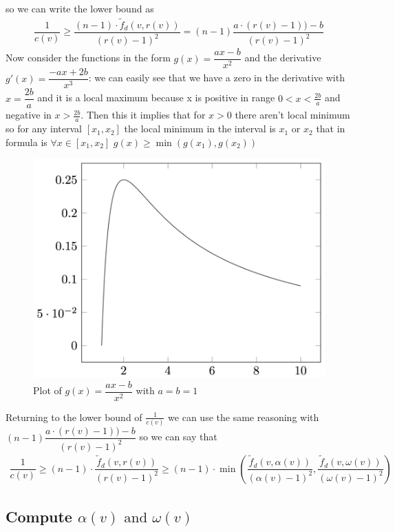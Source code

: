 so we can write the lower bound as 
\begin{align*}
\dfrac{1}{c(v)} \geq \dfrac{(n-1) \cdot \tilde{f}_d(v, r(v))}{(r(v) -1)^2} =(n-1)\dfrac{a \cdot (r(v) - 1))   - b}{(r(v) -1)^2}
\end{align*}
Now consider the functions in the form $ g(x) = \dfrac{ax - b}{x^2} $ and the derivative $ g'(x) = \dfrac{-ax + 2b}{x^3} $: we can easily see that we have a zero in the derivative with $ x = \dfrac{2b}{a} $ and it is a local maximum because x is positive in range $ 0 < x < \frac{2b}{a} $ and negative in $ x > \frac{2b}{a} $. Then this it implies that for $ x > 0 $ there aren't local minimum so for any interval $ [x_1, x_2] $ the local minimum in the interval is $ x_1  $ or $ x_2 $ that in formula is $ \forall x \in [x_1, x_2] \,\, g(x)  \geq \min(g(x_1), g(x_2))$
\begin{figure}[H]
	\includegraphics[width=0.7\linewidth]{img/local_maximum}
	\caption{Plot of $ g(x) = \dfrac{ax -b}{x^2} $ with $ a = b = 1 $}
	\label{fig:localmaximum}
\end{figure}
Returning to the lower bound of $ \frac{1}{c(v)} $ we can use the same reasoning with $ (n-1)\dfrac{a \cdot (r(v) - 1))   - b}{(r(v) -1)^2} $ so we can say that 
\begin{align*}
\dfrac{1}{c(v)} \geq (n-1) \cdot \dfrac{\tilde{f}_d(v, r(v))}{(r(v) -1)^2} \geq (n-1) \cdot \min\left( \dfrac{\tilde{f}_d(v, \alpha(v))}{(\alpha(v) -1)^2}, \dfrac{\tilde{f}_d(v, \omega(v))}{(\omega(v) -1)^2} \right)
\end{align*}

\subsection{Compute $ \alpha(v) \text{ and }  \omega(v) $}